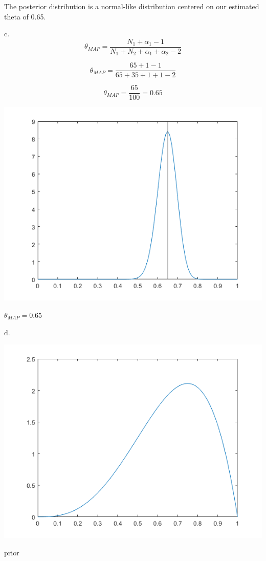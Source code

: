 \documentclass[a4paper]{article}
\begin{document}
The posterior distribution is a normal-like distribution centered on our estimated theta of 0.65.

\noindent
c. 
\[ \theta_{MAP} = \frac{N_1+\alpha_1-1}{N_1+N_2+\alpha_1+\alpha_2-2} \]

\[ \theta_{MAP} =\frac{65+1-1}{65+35+1+1-2} \]

\[ \theta_{MAP} =\frac{65}{100}=0.65 \]

\begin{center}
    \includegraphics[scale=1]{6-c.png}
    \caption{$\theta_{MAP} = 0.65$}
\end{center}



\noindent 
d. 

\begin{center}
    \includegraphics[scale=1]{6-d-prior.png}
    \caption{prior}
\end{center}
\end{document}
